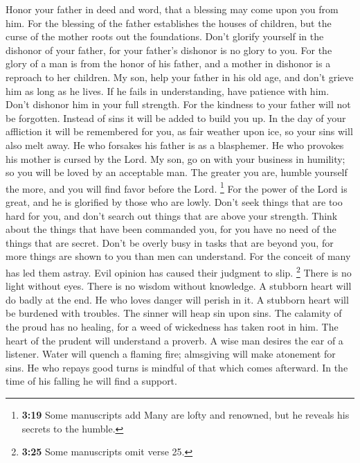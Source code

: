  Honor your father in deed and word, that a blessing may
come upon you from him.  For the blessing of the father
establishes the houses of children, but the curse of the mother roots
out the foundations.  Don't glorify yourself in the
dishonor of your father, for your father's dishonor is no glory to you.
 For the glory of a man is from the honor of his father,
and a mother in dishonor is a reproach to her children. 
My son, help your father in his old age, and don't grieve him as long as
he lives.  If he fails in understanding, have patience
with him. Don't dishonor him in your full strength.  For
the kindness to your father will not be forgotten. Instead of sins it
will be added to build you up.  In the day of your
affliction it will be remembered for you, as fair weather upon ice, so
your sins will also melt away.  He who forsakes his
father is as a blasphemer. He who provokes his mother is cursed by the
Lord.  My son, go on with your business in humility; so
you will be loved by an acceptable man.  The greater you
are, humble yourself the more, and you will find favor before the Lord.
 \footnote{\textbf{3:19} Some manuscripts add Many are
  lofty and renowned, but he reveals his secrets to the humble.}
 For the power of the Lord is great, and he is glorified
by those who are lowly.  Don't seek things that are too
hard for you, and don't search out things that are above your strength.
 Think about the things that have been commanded you, for
you have no need of the things that are secret.  Don't be
overly busy in tasks that are beyond you, for more things are shown to
you than men can understand.  For the conceit of many has
led them astray. Evil opinion has caused their judgment to slip.
 \footnote{\textbf{3:25} Some manuscripts omit verse 25.}
There is no light without eyes. There is no wisdom without knowledge.
 A stubborn heart will do badly at the end. He who loves
danger will perish in it.  A stubborn heart will be
burdened with troubles. The sinner will heap sin upon sins.
 The calamity of the proud has no healing, for a weed of
wickedness has taken root in him.  The heart of the
prudent will understand a proverb. A wise man desires the ear of a
listener.  Water will quench a flaming fire; almsgiving
will make atonement for sins.  He who repays good turns
is mindful of that which comes afterward. In the time of his falling he
will find a support.

